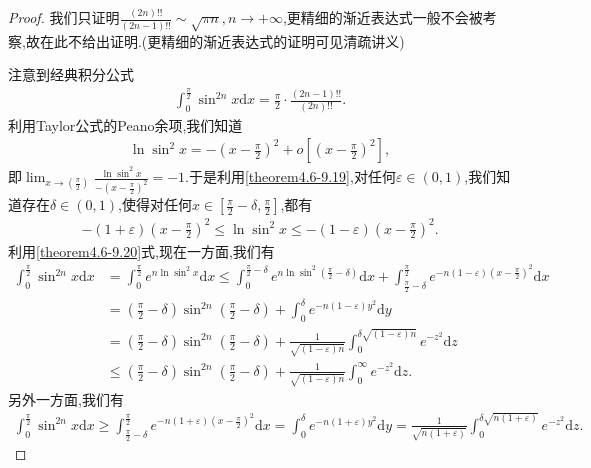 \documentclass[../../main.tex]{subfiles}
\begin{document}
\begin{proof}
我们只证明$\frac{(2n)!!}{(2n-1)!!}\sim \sqrt{\pi n},n\rightarrow +\infty$,更精细的渐近表达式一般不会被考察,故在此不给出证明.(更精细的渐近表达式的证明可见清疏讲义)

注意到经典积分公式
\begin{align}\label{theorem4.6-1.1}
\int_{0}^{\frac{\pi}{2}}\sin^{2n}x \mathrm{d}x=\frac{\pi}{2}\cdot\frac{(2n - 1)!!}{(2n)!!}.
\end{align}
利用Taylor公式的Peano余项,我们知道
\begin{align}\label{theorem4.6-9.19}
\ln\sin^{2}x=-\left(x - \frac{\pi}{2}\right)^{2}+o\left[\left(x - \frac{\pi}{2}\right)^{2}\right],
\end{align}
即\(\lim_{x\rightarrow(\frac{\pi}{2})}\frac{\ln\sin^{2}x}{-(x - \frac{\pi}{2})^{2}}=-1\).于是利用\eqref{theorem4.6-9.19},对任何\(\varepsilon\in(0,1)\),我们知道存在\(\delta\in(0,1)\),使得对任何\(x\in[\frac{\pi}{2}-\delta,\frac{\pi}{2}]\),都有
\begin{align}\label{theorem4.6-9.20}
-(1 + \varepsilon)\left(x - \frac{\pi}{2}\right)^{2}\leqslant\ln\sin^{2}x\leqslant-(1 - \varepsilon)\left(x - \frac{\pi}{2}\right)^{2}.
\end{align}
利用\eqref{theorem4.6-9.20}式,现在一方面,我们有
\begin{align*}
\int_{0}^{\frac{\pi}{2}}\sin^{2n}x \mathrm{d}x&=\int_{0}^{\frac{\pi}{2}}e^{n\ln\sin^{2}x}\mathrm{d}x
\leqslant\int_{0}^{\frac{\pi}{2}-\delta}e^{n\ln\sin^{2}(\frac{\pi}{2}-\delta)}\mathrm{d}x+\int_{\frac{\pi}{2}-\delta}^{\frac{\pi}{2}}e^{-n(1 - \varepsilon)(x - \frac{\pi}{2})^{2}}\mathrm{d}x\\
&=(\frac{\pi}{2}-\delta)\sin^{2n}(\frac{\pi}{2}-\delta)+\int_{0}^{\delta}e^{-n(1 - \varepsilon)y^{2}}\mathrm{d}y\\
&=(\frac{\pi}{2}-\delta)\sin^{2n}(\frac{\pi}{2}-\delta)+\frac{1}{\sqrt{(1 - \varepsilon)n}}\int_{0}^{\delta\sqrt{(1 - \varepsilon)n}}e^{-z^{2}}\mathrm{d}z\\
&\leqslant(\frac{\pi}{2}-\delta)\sin^{2n}(\frac{\pi}{2}-\delta)+\frac{1}{\sqrt{(1 - \varepsilon)n}}\int_{0}^{\infty}e^{-z^{2}}\mathrm{d}z.
\end{align*}
另外一方面,我们有
\begin{align*}
\int_{0}^{\frac{\pi}{2}}\sin^{2n}x \mathrm{d}x\geqslant\int_{\frac{\pi}{2}-\delta}^{\frac{\pi}{2}}e^{-n(1 + \varepsilon)(x - \frac{\pi}{2})^{2}}\mathrm{d}x
=\int_{0}^{\delta}e^{-n(1 + \varepsilon)y^{2}}\mathrm{d}y
=\frac{1}{\sqrt{n(1 + \varepsilon)}}\int_{0}^{\delta\sqrt{n(1 + \varepsilon)}}e^{-z^{2}}\mathrm{d}z.

\end{align*}
\end{proof}
\end{document}

